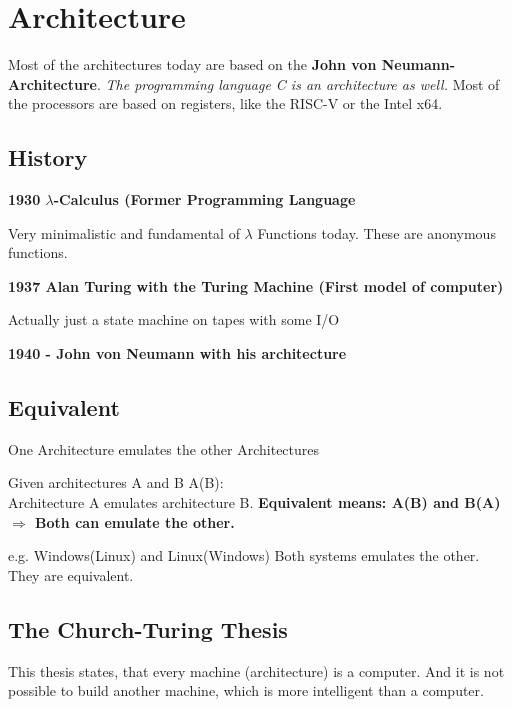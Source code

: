\hypertarget{architecture}{%
\section{Architecture}\label{architecture}}

Most of the architectures today are based on the \textbf{John von
Neumann-Architecture}. \emph{The programming language C is an
architecture as well.} Most of the processors are based on registers,
like the RISC-V or the Intel x64.

\hypertarget{history}{%
\subsection{History}\label{history}}

\textbf{1930 $\lambda$-Calculus (Former Programming Language}

Very minimalistic and fundamental of $\lambda$ Functions today. These are
anonymous functions.

\textbf{1937 Alan Turing with the Turing Machine (First model of
computer)}

Actually just a state machine on tapes with some I/O

\textbf{1940 - John von Neumann with his architecture}

\hypertarget{equivalent}{%
\subsection{Equivalent}\label{equivalent}}

One Architecture emulates the other Architectures

Given architectures A and B A(B):\\
Architecture A emulates architecture B. \textbf{Equivalent means: A(B)
and B(A) $\Rightarrow$ Both can emulate the other.}

\begin{tcolorbox}[colback=red!5!white,colframe=red!75!black]
e.g. Windows(Linux) and Linux(Windows) Both systems emulates the other. They are equivalent. 
\end{tcolorbox}

\hypertarget{the-church-turing-thesis}{%
\subsection{The Church-Turing Thesis}\label{the-church-turing-thesis}}

This thesis states, that every machine (architecture) is a computer. And
it is not possible to build another machine, which is more intelligent
than a computer.

